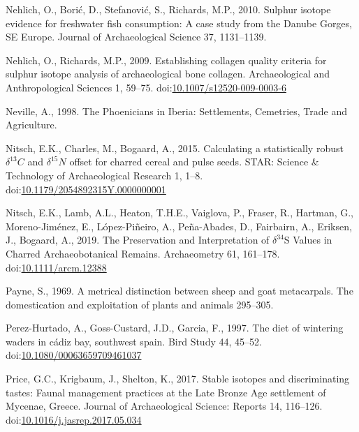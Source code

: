 \documentclass[review]{elsarticle} %
\newlength{\cslhangindent}
\newenvironment{CSLReferences}[2] %
 {%
  \setlength{\parindent}{0pt}
  \ifodd #1 \everypar{\setlength{\hangindent}{\cslhangindent}}\ignorespaces\fi
  \ifnum #2 > 0
  \setlength{\parskip}{#2\baselineskip}
  \fi
 }%
 {}
\begin{document}
\begin{CSLReferences}{1}{0}
\leavevmode{}%
Nehlich, O., Borić, D., Stefanović, S., Richards, M.P., 2010. Sulphur isotope evidence for freshwater fish consumption: A case study from the {Danube Gorges}, {SE Europe}. Journal of Archaeological Science 37, 1131--1139.

\leavevmode{}%
Nehlich, O., Richards, M.P., 2009. Establishing collagen quality criteria for sulphur isotope analysis of archaeological bone collagen. Archaeological and Anthropological Sciences 1, 59--75. doi:\href{https://doi.org/10.1007/s12520-009-0003-6}{10.1007/s12520-009-0003-6}

\leavevmode{}%
Neville, A., 1998. The {Phoenicians} in {Iberia}: {Settlements}, {Cemetries}, {Trade} and {Agriculture}.

\leavevmode{}%
Nitsch, E.K., Charles, M., Bogaard, A., 2015. Calculating a statistically robust \(\delta ^{13}C\) and \(\delta ^{15}N\) offset for charred cereal and pulse seeds. STAR: Science \& Technology of Archaeological Research 1, 1--8. doi:\href{https://doi.org/10.1179/2054892315Y.0000000001}{10.1179/2054892315Y.0000000001}

\leavevmode{}%
Nitsch, E.K., Lamb, A.L., Heaton, T.H.E., Vaiglova, P., Fraser, R., Hartman, G., Moreno-Jiménez, E., López-Piñeiro, A., Peña-Abades, D., Fairbairn, A., Eriksen, J., Bogaard, A., 2019. The {Preservation} and {Interpretation} of {\(\delta^{34}\)S Values} in {Charred Archaeobotanical Remains}. Archaeometry 61, 161--178. doi:\href{https://doi.org/10.1111/arcm.12388}{10.1111/arcm.12388}

\leavevmode{}%
Payne, S., 1969. A metrical distinction between sheep and goat metacarpals. The domestication and exploitation of plants and animals 295--305.

\leavevmode{}%
Perez-Hurtado, A., Goss-Custard, J.D., Garcia, F., 1997. The diet of wintering waders in cádiz bay, southwest spain. Bird Study 44, 45--52. doi:\href{https://doi.org/10.1080/00063659709461037}{10.1080/00063659709461037}

\leavevmode{}%
Price, G.C., Krigbaum, J., Shelton, K., 2017. Stable isotopes and discriminating tastes: {Faunal} management practices at the {Late Bronze Age} settlement of {Mycenae}, {Greece}. Journal of Archaeological Science: Reports 14, 116--126. doi:\href{https://doi.org/10.1016/j.jasrep.2017.05.034}{10.1016/j.jasrep.2017.05.034}


\end{CSLReferences}
\end{document}
